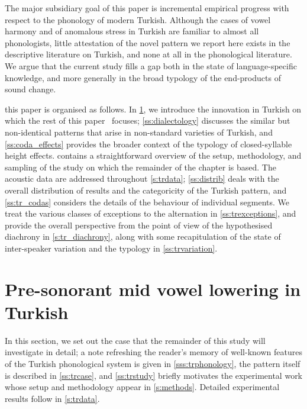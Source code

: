 %
The major subsidiary goal of this paper is incremental empirical progress with respect to the phonology of modern Turkish. Although the cases of vowel harmony and of anomalous stress in Turkish are familiar to almost all phonologists, little attestation of the novel pattern we report here exists in the descriptive literature on Turkish, and none at all in the phonological literature. We argue that the current study fills a gap both in the state of language-specific knowledge, and more generally in the broad typology of the end-products of sound change.

this paper is organised as follows.
In \cref{s:turkishcase}, we introduce the innovation in Turkish on which the rest of this paper \ focuses; \cref{ss:dialectology} discusses the similar but non-identical patterns that arise in non-standard varieties of Turkish, and \cref{ss:coda_effects} provides the broader context of the typology of closed-syllable height effects.  contains a straightforward overview of the setup, methodology, and sampling of the study on which the remainder of the chapter is based. The acoustic data are addressed throughout \cref{s:trdata}; \cref{ss:distrib} deals with the overall distribution of results and the categoricity of the Turkish pattern, and \cref{ss:tr_codas} considers the details of the behaviour of individual segments. We treat the various classes of exceptions to the alternation in \cref{ss:trexceptions}, and provide the overall perspective from the point of view of the hypothesised diachrony in \cref{s:tr_diachrony}, along with some recapitulation of the state of inter-speaker variation and the typology in \cref{ss:trvariation}.

\clearpage
\section{Pre-sonorant mid vowel lowering in Turkish}\label{s:turkishcase}

In this section, we set out the case that the remainder of this study will investigate in detail; a note refreshing the reader's memory of well-known features of the Turkish phonological system is given in \cref{sss:trphonology}, the pattern itself is described in \cref{ss:trcase}, and \cref{ss:trstudy} briefly motivates the experimental work whose setup and methodology appear in \cref{s:methods}. Detailed experimental results follow in \cref{s:trdata}.

